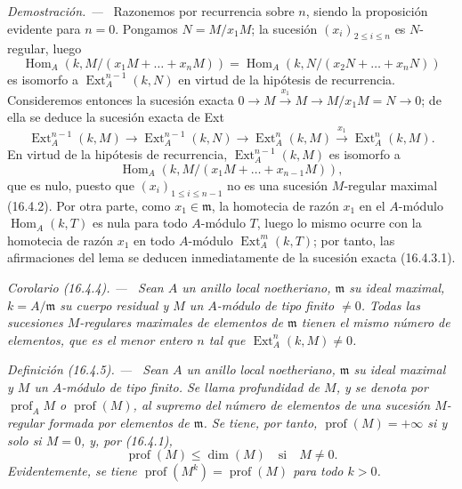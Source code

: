 \documentclass[10pt,oneside]{book}
\makeatletter
\newcommand{\setmanualcurrentlabel}[1]{\def\@currentlabel{#1}}
\newenvironment{definition}[1][]{%
  \setmanualcurrentlabel{#1}\par\medskip\noindent\itshape Definición (#1). ---\ }{\par}
\newenvironment{corollary}[1][]{%
  \setmanualcurrentlabel{#1}\par\medskip\noindent\itshape Corolario (#1). ---\ }{\par}
\newenvironment{proof}{%
  \par\medskip\noindent\textit{Demostración. ---\ }}{\par}
\makeatother
\begin{document}
\begin{proof}
Razonemos por recurrencia sobre $n$, siendo la proposición evidente para
$n=0$. Pongamos $N=M/x_1M$; la sucesión $(x_i)_{2\leq i\leq n}$ es
$N$-regular, luego
\[
  \operatorname{Hom}_A(k,M/(x_1M+\ldots+x_nM))
  =\operatorname{Hom}_A(k,N/(x_2N+\ldots+x_nN))
\]
es isomorfo a $\operatorname{Ext}^{n-1}_A(k,N)$ en virtud de la hipótesis de
recurrencia. Consideremos entonces la sucesión exacta
$0\to M\xrightarrow{x_1}M\to M/x_1M=N\to0$; de ella se deduce la sucesión
exacta de Ext
\begin{equation}
\label{0.16.4.3.1-es}
\tag{16.4.3.1}
  \operatorname{Ext}^{n-1}_A(k,M)
  \to\operatorname{Ext}^{n-1}_A(k,N)
  \to\operatorname{Ext}^n_A(k,M)
  \xrightarrow{x_1}\operatorname{Ext}^n_A(k,M).
\end{equation}
En virtud de la hipótesis de recurrencia, $\operatorname{Ext}^{n-1}_A(k,M)$
es isomorfo a
\[
  \operatorname{Hom}_A(k,M/(x_1M+\ldots+x_{n-1}M)),
\]
que es nulo, puesto que $(x_i)_{1\leq i\leq n-1}$ no es una sucesión
$M$-regular maximal (16.4.2). Por otra parte, como
$x_1\in\mathfrak{m}$, la homotecia de razón $x_1$ en el $A$-módulo
$\operatorname{Hom}_A(k,T)$ es nula para todo $A$-módulo $T$, luego lo mismo
ocurre con la homotecia de razón $x_1$ en todo $A$-módulo
$\operatorname{Ext}^m_A(k,T)$; por tanto, las afirmaciones del lema se deducen
inmediatamente de la sucesión exacta (16.4.3.1).
\end{proof}

\begin{corollary}[16.4.4]
\label{0.16.4.4-es}
Sean $A$ un anillo local noetheriano, $\mathfrak{m}$ su ideal maximal,
$k=A/\mathfrak{m}$ su cuerpo residual y $M$ un $A$-módulo de tipo finito
$\neq0$. Todas las sucesiones $M$-regulares maximales de elementos de
$\mathfrak{m}$ tienen el mismo número de elementos, que es el menor entero $n$
tal que $\operatorname{Ext}^n_A(k,M)\neq0$.
\end{corollary}

\begin{definition}[16.4.5]
\label{0.16.4.5-es}
Sean $A$ un anillo local noetheriano, $\mathfrak{m}$ su ideal maximal y $M$ un
$A$-módulo de tipo finito. Se llama profundidad de $M$, y se denota por
$\operatorname{prof}_A M$ o $\operatorname{prof}(M)$, al supremo del número de
elementos de una sucesión $M$-regular formada por elementos de
$\mathfrak{m}$. Se tiene, por tanto, $\operatorname{prof}(M)=+\infty$ si y
solo si $M=0$, y, por (16.4.1),
\begin{equation}
\label{0.16.4.5.1-es}
\tag{16.4.5.1}
  \operatorname{prof}(M)\leq\dim(M)\quad\text{si}\quad M\neq0.
\end{equation}
Evidentemente, se tiene $\operatorname{prof}(M^k)=\operatorname{prof}(M)$ para
todo $k>0$.
\end{definition}
\end{document}
